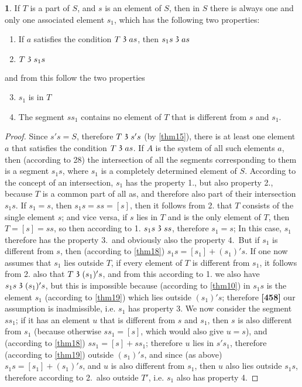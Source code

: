 \documentclass[leqno,hidelinks,a4paper]{article}
\theoremstyle{definition}
\newtheorem{satz}{\protect\satzname}
\newcommand{\satzname}{}
\renewcommand{\satzname}{\hspace{-4pt}.\ Satz}%
\renewcommand{\satzname}{\hspace{-4pt}.\ Theorem}%
\newcommand\partof{\mathrel{\raisebox{0.45ex}{$\mathfrak{3}$}}}
\begin{document}
\begin{satz}\label{thm29}
If $T$ is a part of $S$, and $s$ is an element of $S$, then in $S$ there is always one and only one associated element $s_1$, which has the following two properties:
\begin{enumerate}[1.]
	\item If $a$ satisfies the condition $T \partof as$, then $s_1s \partof as$
	\item $T \partof s_1s$
\end{enumerate}
and from this follow the two properties
\begin{enumerate}[1.]
	\setcounter{enumi}{2}
	\item $s_1$ is in $T$
	\item The segment $ss_1$ contains no element of $T$ that is different from $s$ and $s_1$.
\end{enumerate}
\end{satz}
\begin{proof}
Since $s's = S$, therefore $T \partof s's$ (by \ref{thm15}), there is at least one element $a$ that satisfies the condition $T \partof as$. If $A$ is the system of all such elements $a$, then (according to 28) the intersection of all the segments corresponding to them is a segment $s_1s$, where $s_1$ is a completely determined element of $S$.
According to the concept of an intersection, $s_1$ has the property 1., but also property 2., because $T$ is a common part of all as, and therefore also part of their intersection $s_1s$. If $s_1=s$, then $s_1s=ss=[s]$, then it follows from 2. that $T$ consists of the single element $s$; and vice versa, if $s$ lies in $T$ and is the only element of $T$, then $T = [s] = ss$, so then according to 1. $s_1s \partof ss$, therefore $s_1 = s$; In this case, $s_1$ therefore has the property 3.\ and obviously also the property 4.\ But if $s_1$ is different from $s$, then (according to \ref{thm18}) $s_1s= [s_1]+(s_1)'s$.
If one now assumes that $s_1$ lies outside $T$, if every element of $T$ is different from $s_1$, it follows from 2. also that $T \partof (s_1)'s$, and from this according to 1. we also have $s_1s \partof (s_1)'s$, but this is impossible because (according to \ref{thm10}) in $s_1s$ is the element $s_1$ (according to \ref{thm19}) which lies outside $(s_1)'s$; therefore
\textbf{[458]}
our assumption is inadmissible, i.e. $s_1$ has property 3.
We now consider the segment $ss_1$; if it has an element $u$ that is different from $s$ and $s_1$, then $s$ is also different from $s_1$ (because otherwise $ss_1 = [s]$, which would also give $u=s$), and (according to \ref{thm18}) $ss_1 = [s] + ss_1$; therefore $u$ lies in $s's_1$, therefore (according to \ref{thm19}) outside $(s_1)'s$, and since (as above) $s_1s= [s_1] + (s_1)'s$, and $u$ is also different from $s_1$, then $u$ also lies outside $s_1s$, therefore according to 2.\ also outside $T'$, i.e. $s_1$ also has property 4.
\end{proof}
\end{document}
